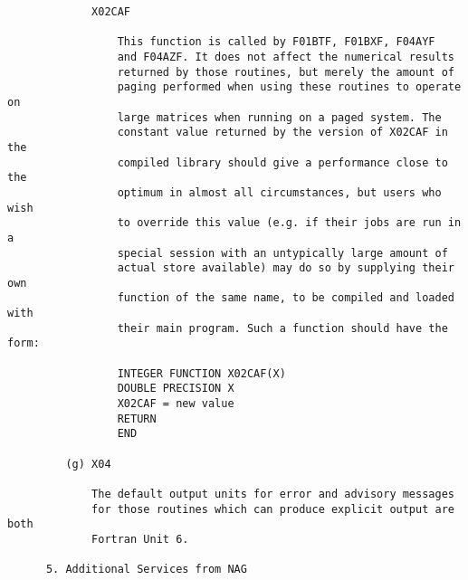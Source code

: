 \begin{small}
\begin{verbatim}
             X02CAF                                                             
                                                                                
                 This function is called by F01BTF, F01BXF, F04AYF              
                 and F04AZF. It does not affect the numerical results           
                 returned by those routines, but merely the amount of           
                 paging performed when using these routines to operate on       
                 large matrices when running on a paged system. The             
                 constant value returned by the version of X02CAF in the        
                 compiled library should give a performance close to the        
                 optimum in almost all circumstances, but users who wish        
                 to override this value (e.g. if their jobs are run in a        
                 special session with an untypically large amount of            
                 actual store available) may do so by supplying their own       
                 function of the same name, to be compiled and loaded with      
                 their main program. Such a function should have the form:      
                                                                                
                 INTEGER FUNCTION X02CAF(X)                                     
                 DOUBLE PRECISION X                                             
                 X02CAF = new value                                             
                 RETURN                                                         
                 END                                                            
                                                                                
         (g) X04                                                                
                                                                                
             The default output units for error and advisory messages           
             for those routines which can produce explicit output are both      
             Fortran Unit 6.                                                    
                                                                                
      5. Additional Services from NAG                                           
                                                                                

\end{verbatim}
\end{small}
